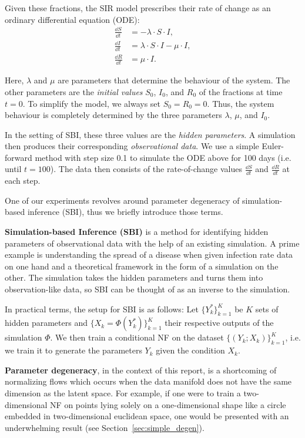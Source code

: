 Given these fractions, the SIR model prescribes their rate of change as an ordinary differential equation (ODE):
\begin{align*}
    \frac{\dd S}{\dd t} &= -\lambda \cdot S \cdot I,\\
    \frac{\dd I}{\dd t} &= \lambda \cdot S \cdot I - \mu \cdot I,\\
    \frac{\dd R}{\dd t} &= \mu \cdot I.
\end{align*}

Here, $\lambda$ and $\mu$ are parameters that determine the behaviour of the system. The other parameters are the \textit{initial values} $S_0$, $I_0$, and $R_0$ of the fractions at time {$t = 0$}. To simplify the model, we always set {$S_0 = R_0 = 0$}. Thus, the system behaviour is completely determined by the three parameters $\lambda$, $\mu$, and $I_0$.

In the setting of SBI, these three values are the \textit{hidden parameters}. A simulation then produces their corresponding \textit{observational data}. We use a simple Euler-forward method with step size 0.1 to simulate the ODE above for 100 days (i.e. until {$t = 100$}). The data then consists of the rate-of-change values $\frac{\dd S}{\dd t}$ and $\frac{\dd R}{\dd t}$ at each step.

\label{sec:background_param_degen}

One of our experiments revolves around parameter degeneracy of simulation-based inference (SBI), thus we briefly introduce those terms.

\textbf{Simulation-based Inference (SBI)} is a method for identifying hidden parameters of observational data with the help of an existing simulation. A prime example is understanding the spread of a disease when given infection rate data on one hand and a theoretical framework in the form of a simulation on the other. The simulation takes the hidden parameters and turns them into observation-like data, so SBI can be thought of as an inverse to the simulation.

In practical terms, the setup for SBI is as follows: Let $\{Y_k^{*}\}_{k=1}^K$ be $K$ sets of hidden parameters and $\{X_k = \Phi(Y_k^{*})\}_{k=1}^K$ their respective outputs of the simulation $\Phi$. We then train a conditional NF on the dataset $\{(Y_k; X_k)\}_{k=1}^K$, i.e. we train it to generate the parameters $Y_k$ given the condition $X_k$.

\textbf{Parameter degeneracy}, in the context of this report, is a shortcoming of normalizing flows which occurs when the data manifold does not have the same dimension as the latent space. For example, if one were to train a two-dimensional NF on points lying solely on a one-dimensional shape like a circle embedded in two-dimensional euclidean space, one would be presented with an underwhelming result (see Section~\ref{sec:simple_degen}).

